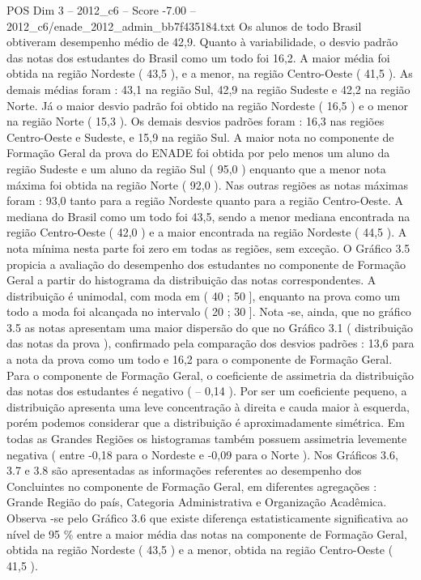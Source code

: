 \begin{textsample}{POS Dim 3 – 2012\_c6 – Score -7.00 – 2012\_c6/enade\_2012\_admin\_bb7f435184.txt}
Os alunos de todo Brasil obtiveram desempenho médio de 42,9.
Quanto à variabilidade, o desvio padrão das notas dos estudantes do Brasil como um todo foi 16,2.
A maior média foi obtida na região Nordeste ( 43,5 ), e a menor, na região Centro-Oeste ( 41,5 ).
As demais médias foram : 43,1 na região Sul, 42,9 na região Sudeste e 42,2 na região Norte.
Já o maior desvio padrão foi obtido na região Nordeste ( 16,5 ) e o menor na região Norte ( 15,3 ).
Os demais desvios padrões foram : 16,3 nas regiões Centro-Oeste e Sudeste, e 15,9 na região Sul.
A maior nota no componente de Formação Geral da prova do ENADE foi obtida por pelo menos um aluno da região Sudeste e um aluno da região Sul ( 95,0 ) enquanto que a menor nota máxima foi obtida na região Norte ( 92,0 ).
Nas outras regiões as notas máximas foram : 93,0 tanto para a região Nordeste quanto para a região Centro-Oeste.
A mediana do Brasil como um todo foi 43,5, sendo a menor mediana encontrada na região Centro-Oeste ( 42,0 ) e a maior encontrada na região Nordeste ( 44,5 ).
A nota mínima nesta parte foi zero em todas as regiões, sem exceção.
O Gráfico 3.5 propicia a avaliação do desempenho dos estudantes no componente de Formação Geral a partir do histograma da distribuição das notas correspondentes.
A distribuição é unimodal, com moda em ( 40 ; 50 ], enquanto na prova como um todo a moda foi alcançada no intervalo ( 20 ; 30 ].
Nota -se, ainda, que no gráfico 3.5 as notas apresentam uma maior dispersão do que no Gráfico 3.1 ( distribuição das notas da prova ), confirmado pela comparação dos desvios padrões : 13,6 para a nota da prova como um todo e 16,2 para o componente de Formação Geral.
Para o componente de Formação Geral, o coeficiente de assimetria da distribuição das notas dos estudantes é negativo ( – 0,14 ).
Por ser um coeficiente pequeno, a distribuição apresenta uma leve concentração à direita e cauda maior à esquerda, porém podemos considerar que a distribuição é aproximadamente simétrica.
Em todas as Grandes Regiões os histogramas também possuem assimetria levemente negativa ( entre -0,18 para o Nordeste e -0,09 para o Norte ).
Nos Gráficos 3.6, 3.7 e 3.8 são apresentadas as informações referentes ao desempenho dos Concluintes no componente de Formação Geral, em diferentes agregações : Grande Região do país, Categoria Administrativa e Organização Acadêmica.
Observa -se pelo Gráfico 3.6 que existe diferença estatisticamente significativa ao nível de 95 \% entre a maior média das notas na componente de Formação Geral, obtida na região Nordeste ( 43,5 ) e a menor, obtida na região Centro-Oeste ( 41,5 ).

\end{textsample}
